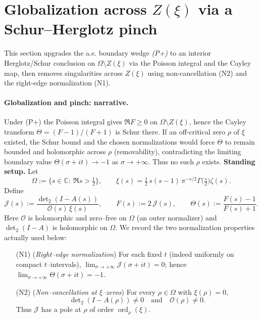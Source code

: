\documentclass[11pt]{article}
\theoremstyle{definition}
\theoremstyle{remark}
\begin{document}
\section{Globalization across $Z(\xi)$ via a Schur--Herglotz pinch}\label{sec:globalization}
\noindent This section upgrades the a.e. boundary wedge \emph{(P+)} to an interior Herglotz/Schur conclusion on $\Omega\setminus Z(\xi)$ via the Poisson integral and the Cayley map, then removes singularities across $Z(\xi)$ using non-cancellation \textnormal{(N2)} and the right-edge normalization \textnormal{(N1)}.
\paragraph{Globalization and pinch: narrative.}
Under (P+) the Poisson integral gives $\Re F\ge 0$ on $\Omega\setminus Z(\xi)$, hence the Cayley transform $\Theta=(F-1)/(F+1)$ is Schur there. If an off-critical zero $\rho$ of $\xi$ existed, the Schur bound and the chosen normalizations would force $\Theta$ to remain bounded and holomorphic across $\rho$ (removability), contradicting the limiting boundary value $\Theta(\sigma+it)\to-1$ as $\sigma\to+\infty$. Thus no such $\rho$ exists.
\noindent\textbf{Standing setup.}
Let
\[
\Omega:=\{s\in\mathbb C:\ \Re s>\tfrac12\},\qquad
\xi(s)=\tfrac12\,s(s-1)\,\pi^{-s/2}\Gamma\!\big(\tfrac s2\big)\zeta(s).
\]
Define
\[
\mathcal J(s):=\frac{\det\nolimits_2(I-A(s))}{\mathcal O(s)\,\xi(s)},\qquad
F(s):=2\,\mathcal J(s),\qquad
\Theta(s):=\frac{F(s)-1}{F(s)+1}.
\]
Here $\mathcal O$ is holomorphic and zero--free on $\Omega$ (an outer normalizer) and
$\det\nolimits_2(I-A)$ is holomorphic on $\Omega$.
We record the two normalization properties actually used below:
\begin{itemize}
\item[(N1)] (\emph{Right--edge normalization}) For each fixed $t$ (indeed uniformly on compact $t$–intervals), $\displaystyle\lim_{\sigma\to+\infty}\mathcal J(\sigma+it)=0$; hence $\displaystyle\lim_{\sigma\to+\infty}\Theta(\sigma+it)=-1$.
\item[(N2)] (\emph{Non--cancellation at $\xi$--zeros}) For every $\rho\in\Omega$ with $\xi(\rho)=0$,
\[
\det\nolimits_2(I-A(\rho))\neq0\quad\text{and}\quad \mathcal O(\rho)\neq0.
\]
Thus $\mathcal J$ has a pole at $\rho$ of order $\operatorname{ord}_\rho(\xi)$.
\end{itemize}
\end{document}

